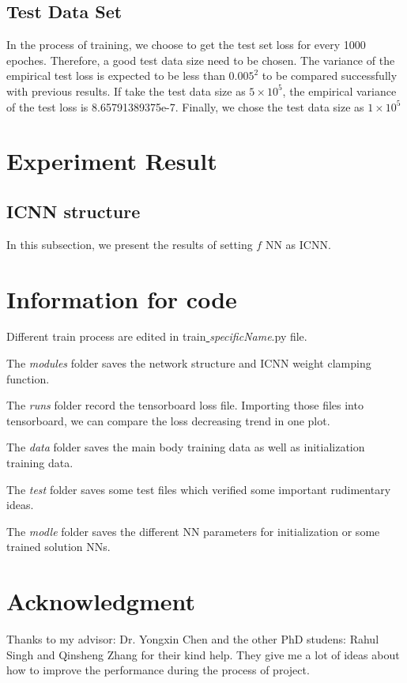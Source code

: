 \documentclass[conference,compsoc]{IEEEtran}
\begin{document}
\subsection{Test Data Set}
In the process of training, we choose to get the test set loss for every 1000 epoches. Therefore, a good test data size need to be chosen. The variance of the empirical test loss is expected to be less than $0.005^2$ to be compared successfully with previous results. If take the test data size as $5\times10^5$, the empirical variance of the test loss is 8.65791389375e-7. Finally, we chose the test data size as $1\times10^5$

\section{Experiment Result}
\subsection{ICNN structure}
In this subsection, we present the results of setting $f$ NN as ICNN.

\section*{Information for code}

Different train process are edited in train\underline{ }\textit{specificName}.py file. 

The \textit{modules} folder saves the network structure and ICNN weight clamping function.

The \textit{runs} folder record the tensorboard loss file. Importing those files into tensorboard, we can compare the loss decreasing trend in one plot.

The \textit{data} folder saves the main body training data as well as initialization training data.

The \textit{test} folder saves some test files which verified some important rudimentary ideas.

The \textit{modle} folder saves the different NN parameters for initialization or some trained solution NNs.

\section*{Acknowledgment}

Thanks to my advisor: Dr. Yongxin Chen and the other PhD studens: Rahul Singh and Qinsheng Zhang for their kind help. They give me a lot of ideas about how to improve the performance during the process of project.



\end{document}

